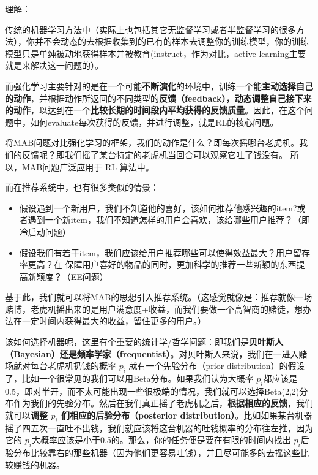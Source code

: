 \documentclass[12pt]{article}
\begin{document}
\begin{framed}
理解：

传统的机器学习方法中（实际上也包括其它无监督学习或者半监督学习的很多方法），你并不会动态的去根据收集到的已有的样本去调整你的训练模型，你的训练模型只是单纯被动地获得样本并被教育(instruct，作为对比，active learning主要就是来解决这一问题的）。

而强化学习主要针对的是在一个可能\textbf{不断演化}的环境中，训练一个能\textbf{主动选择自己的动作}，并根据动作所返回的不同类型的\textbf{反馈（feedback），动态调整自己接下来的动作}，以达到在一个\textbf{比较长期的时间段内平均获得的反馈质量}。因此，在这个问题中，如何evaluate每次获得的反馈，并进行调整，就是RL的核心问题。

将MAB问题对比强化学习的框架，我们的动作是什么？即每次摇哪台老虎机。我们的反馈呢？即我们摇了某台特定的老虎机当回合可以观察它吐了钱没有。
所以，MAB问题广泛应用于 RL 算法中。
\end{framed}


而在推荐系统中，也有很多类似的情景：
\begin{itemize}
\setlength{\itemsep}{0pt}
\setlength{\parsep}{0pt}
\setlength{\parskip}{0pt}
    \item 假设遇到一个新用户，我们不知道他的喜好，该如何推荐他感兴趣的item?或者遇到一个新item，我们不知道怎样的用户会喜欢，该给哪些用户推荐？（即冷启动问题）
    \item 假设我们有若干item，我们应该给用户推荐哪些可以使得效益最大？用户留存率更高？在 保障用户喜好的物品的同时，更加科学的推荐一些新颖的东西提高新颖度？（EE问题）
\end{itemize}

基于此，我们就可以将MAB的思想引入推荐系统。（这感觉就像是：推荐就像一场赌博，老虎机摇出来的是用户满意度+收益，而我们要做一个高智商的赌徒，想办法在一定时间内获得最大的收益，留住更多的用户。）

该如何选择机器呢，这里有个重要的统计学/哲学问题\cite{MAB_And_RL_Introduction}：即我们是\textbf{贝叶斯人（Bayesian）还是频率学家（frequentist）}。对贝叶斯人来说，我们在一进入赌场就对每台老虎机扔钱的概率 $p_i$ 就有一个先验分布（prior distribution）的假设了，比如一个很常见的我们可以用Beta分布。如果我们认为大概率 $p_i$都应该是0.5，即对半开，而不太可能出现一些很极端的情况，我们就可以选择Beta(2,2)分布作为我们的先验分布。然后在我们真正摇了老虎机之后，\textbf{根据相应的反馈}，我们就可以\textbf{调整 $p_i$ 们相应的后验分布（posterior distribution）}。比如如果某台机器摇了四五次一直吐不出钱，我们就应该将这台机器的吐钱概率的分布往左推，因为它的 $p_i$大概率应该是小于0.5的。那么，你的任务便是要在有限的时间内找出 $p_i$后验分布比较靠右的那些机器（因为他们更容易吐钱），并且尽可能多的去摇这些比较赚钱的机器。
\end{document}
